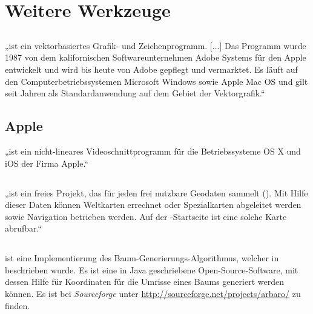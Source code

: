 \section{Weitere Werkzeuge}
	
	\subsection{\Illustrator}
	
	„\Illustrator [...] ist ein vektorbasiertes Grafik- und Zeichenprogramm. [...] Das Programm wurde 1987 von dem kalifornischen Softwareunternehmen Adobe Systems für den Apple  entwickelt und wird bis heute von Adobe gepflegt und vermarktet. Es läuft auf den Computerbetriebssystemen Microsoft Windows sowie Apple Mac OS und gilt seit Jahren als Standardanwendung auf dem Gebiet der Vektorgrafik.“ \cite{Wiki-Illustrator}
	
	\subsection{Apple \iMovie}
	
	„\iMovie ist ein nicht-lineares Videoschnittprogramm für die Betriebssysteme OS X und iOS der Firma Apple.“ \cite{Wiki-iMovie}
	
	\subsection{\OSM}
	
	„\OSM ist ein freies Projekt, das für jeden frei nutzbare Geodaten sammelt (). Mit Hilfe dieser Daten können Weltkarten errechnet oder Spezialkarten abgeleitet werden sowie Navigation betrieben werden. Auf der \OSM-Startseite ist eine solche Karte abrufbar.“ \cite{Wiki-OSM}
	
	\subsection{\Arbaro}
	
	\Arbaro ist eine Implementierung des Baum-Generierungs-Algorithmus, welcher in \cite{Weber+95} beschrieben wurde. Es ist eine in Java geschriebene Open-Source-Software, mit dessen Hilfe für \Povray Koordinaten für die Umrisse eines Baums generiert werden können. Es ist bei \textit{Sourceforge} unter \url{http://sourceforge.net/projects/arbaro/} zu finden.